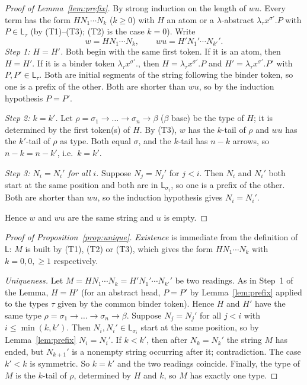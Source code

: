 \documentclass[11pt,a4paper]{article}
\theoremstyle{definition}
\theoremstyle{plain}
\newcommand{\Lang}{\mathsf{L}}
\begin{document}
\begin{proof}[Proof of Lemma~\ref{lem:prefix}]
By strong induction on the length of $wu$.
Every term has the form $HN_1\cdots N_k$ ($k\ge0$) with $H$ an atom
or a $\lambda$-abstract $\lambda_\tau x^{\sigma'}.P$ with $P\in\Lang_\tau$
(by (T1)--(T3); (T2) is the case $k=0$).
Write
\[
  w=HN_1\cdots N_k,\qquad wu=H'N_1'\cdots N_{k'}'.
\]
\emph{Step 1: $H=H'$.}
Both begin with the same first token.
If it is an atom, then $H=H'$.
If it is a binder token $\lambda_\tau x^{\sigma'}.$, then
$H=\lambda_\tau x^{\sigma'}.P$ and $H'=\lambda_\tau x^{\sigma'}.P'$
with $P,P'\in\Lang_\tau$. Both are initial segments of the string
following the binder token, so one is a prefix of the other.
Both are shorter than $wu$, so by the induction hypothesis $P=P'$.

\emph{Step 2: $k=k'$.}
Let $\rho=\sigma_1\to\dots\to\sigma_n\to\beta$ ($\beta$ base) be the type of $H$;
it is determined by the first token(s) of $H$.
By (T3), $w$ has the $k$-tail of $\rho$ and $wu$ has the $k'$-tail of $\rho$ as type.
Both equal $\sigma$, and the $k$-tail has $n-k$ arrows,
so $n-k=n-k'$, i.e.\ $k=k'$.

\emph{Step 3: $N_i=N_i'$ for all $i$.}
Suppose $N_j=N_j'$ for $j<i$. Then $N_i$ and $N_i'$ both start at the same
position and both are in $\Lang_{\sigma_i}$, so one is a prefix of the other.
Both are shorter than $wu$, so the induction hypothesis gives $N_i=N_i'$.

Hence $w$ and $wu$ are the same string and $u$ is empty.
\end{proof}

\begin{proof}[Proof of Proposition~\ref{prop:unique}]
\emph{Existence} is immediate from the definition of $\Lang$:
$M$ is built by (T1), (T2) or (T3), which gives the form $HN_1\cdots N_k$
with $k=0,0,\ge1$ respectively.

\emph{Uniqueness.} Let
$M=HN_1\cdots N_k=H'N_1'\cdots N_{k'}'$ be two readings.
As in Step~1 of the Lemma, $H=H'$ (for an abstract head, $P=P'$ by Lemma~\ref{lem:prefix}
applied to the types $\tau$ given by the common binder token).
Hence $H$ and $H'$ have the same type $\rho=\sigma_1\to\dots\to\sigma_n\to\beta$.
Suppose $N_j=N_j'$ for all $j<i$ with $i\le\min(k,k')$.
Then $N_i,N_i'\in\Lang_{\sigma_i}$ start at the same position,
so by Lemma~\ref{lem:prefix} $N_i=N_i'$.
If $k<k'$, then after $N_k=N_k'$ the string $M$ has ended, but $N_{k+1}'$ is a
nonempty string occurring after it; contradiction. The case $k'<k$ is symmetric.
So $k=k'$ and the two readings coincide.
Finally, the type of $M$ is the $k$-tail of $\rho$, determined by $H$ and $k$,
so $M$ has exactly one type.
\end{proof}
\end{document}
